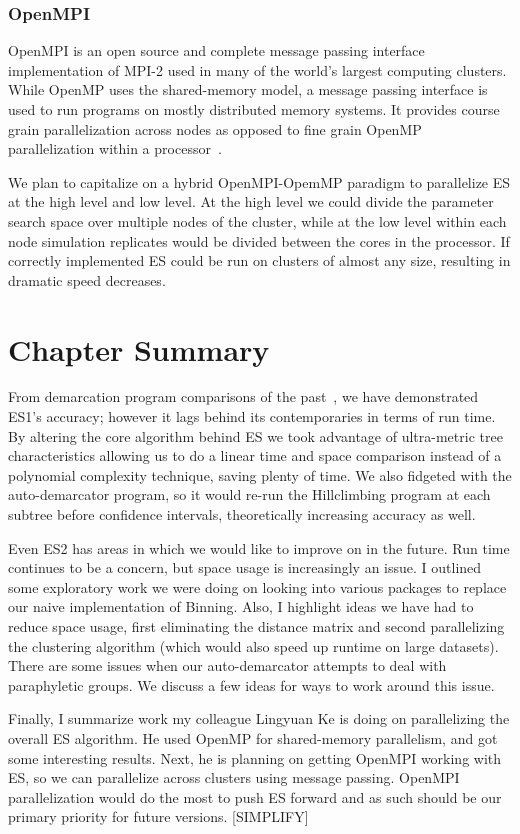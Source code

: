 \subsubsection*{OpenMPI}
OpenMPI is an open source and complete message passing interface implementation of MPI-2 used in many of the world's largest computing clusters.
While OpenMP uses the shared-memory model, a message passing interface is used to run programs on mostly distributed memory systems.
It provides course grain parallelization across nodes as opposed to fine grain OpenMP parallelization within a processor~\cite{gabriel04:_open_mpi}.

We plan to capitalize on a hybrid OpenMPI-OpemMP paradigm to parallelize ES at the high level and low level.
At the high level we could divide the parameter search space over multiple nodes of the cluster, while at the low level within each node simulation replicates would be divided between the cores in the processor.
If correctly implemented ES could be run on clusters of almost any size, resulting in dramatic speed decreases.


\section{Chapter Summary}
From demarcation program comparisons of the past~\cite{carlo}, we have demonstrated ES1's accuracy; however it lags behind its contemporaries in terms of run time.
By altering the core algorithm behind ES we took advantage of ultra-metric tree characteristics allowing us to do a linear time and space comparison instead of a polynomial complexity technique, saving plenty of time.
We also fidgeted with the auto-demarcator program, so it would re-run the Hillclimbing program at each subtree before confidence intervals, theoretically increasing accuracy as well.

Even ES2 has areas in which we would like to improve on in the future.
Run time continues to be a concern, but space usage is increasingly an issue.
I outlined some exploratory work we were doing on looking into various packages to replace our naive implementation of Binning.
Also, I highlight ideas we have had to reduce space usage, first eliminating the distance matrix and second parallelizing the clustering algorithm (which would also speed up runtime on large datasets).
There are some issues when our auto-demarcator attempts to deal with paraphyletic groups.
We discuss a few ideas for ways to work around this issue.

Finally, I summarize work my colleague Lingyuan Ke is doing on parallelizing the overall ES algorithm.
He used OpenMP for shared-memory parallelism, and got some interesting results.
Next, he is planning on getting OpenMPI working with ES, so we can parallelize across clusters using message passing.
OpenMPI parallelization would do the most to push ES forward and as such should be our primary priority for future versions.
[SIMPLIFY]

